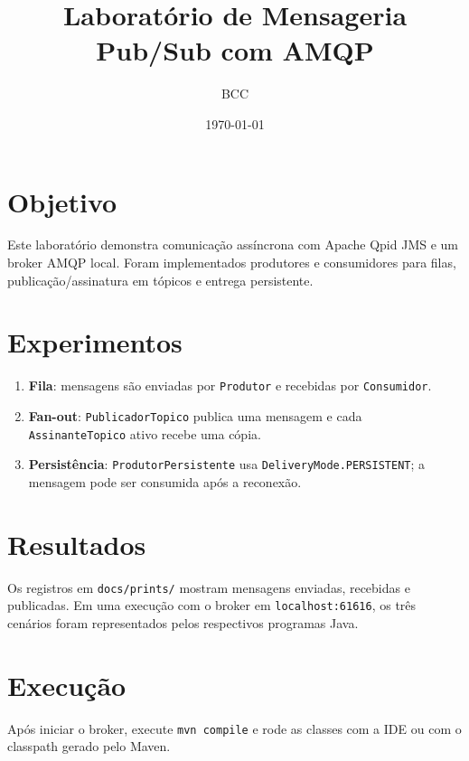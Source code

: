\documentclass[12pt,a4paper]{article}
\title{Laboratório de Mensageria Pub/Sub com AMQP}
\author{BCC}
\date{\today}
\begin{document}
\maketitle

\section{Objetivo}
Este laboratório demonstra comunicação assíncrona com Apache Qpid JMS e um broker AMQP local.
Foram implementados produtores e consumidores para filas, publicação/assinatura em tópicos e entrega persistente.

\section{Experimentos}
\begin{enumerate}
  \item \textbf{Fila}: mensagens são enviadas por \texttt{Produtor} e recebidas por \texttt{Consumidor}.
  \item \textbf{Fan-out}: \texttt{PublicadorTopico} publica uma mensagem e cada \texttt{AssinanteTopico} ativo recebe uma cópia.
  \item \textbf{Persistência}: \texttt{ProdutorPersistente} usa \texttt{DeliveryMode.PERSISTENT}; a mensagem pode ser consumida após a reconexão.
\end{enumerate}

\section{Resultados}
Os registros em \texttt{docs/prints/} mostram mensagens enviadas, recebidas e publicadas.
Em uma execução com o broker em \texttt{localhost:61616}, os três cenários foram representados pelos respectivos programas Java.

\section{Execução}
Após iniciar o broker, execute \texttt{mvn compile} e rode as classes com a IDE ou com o classpath gerado pelo Maven.
\end{document}
